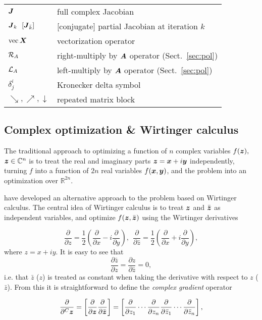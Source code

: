 \documentclass[useAMS,usenatbib]{mn2e}
\newcommand{\COMPLEX}{\mathbb{C}}
\newcommand{\REAL}{\mathbb{R}}
\newcommand{\zz}{\bmath{z}}
\newcommand{\mat}[1]{{\bmath{#1}}}
\newcommand{\JJ}{\mat{J}} %
\begin{document}
\begin{table}
\begin{tabular}{ll}
$\JJ$ & full complex Jacobian \\
$\JJ_k~~[\JJ_{\bar k}]$ & [conjugate] partial Jacobian at iteration $k$\\
$\mathrm{vec}\,\bmath{X}$ & vectorization operator \\
$\mathcal{R}_{{A}}$ & right-multiply by $\bmath{A}$ operator (Sect.~\ref{sec:pol}) \\
$\mathcal{L}_{{A}}$ & left-multiply by $\bmath{A}$ operator (Sect.~\ref{sec:pol}) \\
$\delta^i_j$ & Kronecker delta symbol \\
$\searrow,\nearrow,\downarrow$ & repeated matrix block \\
\hline



\end{tabular}
\end{table}

\subsection{Complex optimization \& Wirtinger calculus}

The traditional approach to optimizing a function of $n$ complex variables $f(\zz),$ $\zz\in\COMPLEX^n$ is
to treat the real and imaginary parts $\zz=\bmath{x}+i\bmath{y}$ independently, turning $f$ into a function
of $2n$ real variables $f(\bmath{x},\bmath{y})$, and the problem into an optimization over $\REAL^{2n}$.

\citet{ComplexOpt} have developed an alternative approach to the problem based on Wirtinger calculus. The central idea
of Wirtinger calculus is to treat $\zz$ and $\bar{\zz}$ as independent variables, and optimize $f(\zz,\bar{\zz})$
using the Wirtinger derivatives 

\[
\frac{\partial}{\partial z} = \frac{1}{2}\left ( \frac{\partial}{\partial x} - i\frac{\partial}{\partial y} \right),~~
\frac{\partial}{\partial \bar{z}} = \frac{1}{2}\left ( \frac{\partial}{\partial x} + i\frac{\partial}{\partial y} \right),
\]
where $z=x+iy$. It is easy to see that  
\[
\frac{\partial \bar z}{\partial z} = 
\frac{\partial z}{\partial \bar z} = 0,
\]
i.e. that $\bar z$ ($z$) is treated as constant when taking the derivative with respect to $z$ ($\bar z$). From this 
it is straightforward to define the \emph{complex gradient} operator 

\[
\frac{\partial}{\partial^C \zz} = \left [ \frac{\partial}{\partial \zz} \frac{\partial}{\partial \bar{\zz}} \right ] = \left [ \frac{\partial}{\partial z_1} \cdots \frac{\partial}{\partial z_n}
\frac{\partial}{\partial \bar{z}_1} \cdots \frac{\partial}{\partial \bar{z}_n} \right ],
\]
\end{document}

